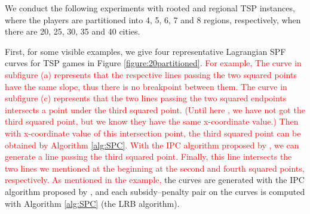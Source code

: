 \documentclass[authoryear,review,12pt]{elsarticle}
\begin{document}
We conduct the following experiments with rooted and regional TSP instances, where the players are partitioned into 4, 5, 6, 7 and 8 regions, respectively, when there are 20, 25, 30, 35 and 40 cities.

First, for some visible examples, we give four representative Lagrangian SPF curves for TSP games in Figure \ref{figure:20partitioned}.
\textcolor{red}{For example, The curve in subfigure (a) represents that the respective lines passing the two squared points have the same slope, thus there is no breakpoint between them. The curve in subfigure (c) represents that the two lines passing the two squared endpoints intersects a point under the third squared point. (Until here , we have not got the third squared point, but we know they have the same x-coordinate value.) Then with x-coordinate value of this intersection point, the third squared point can be obtained by Algorithm \ref{alg:SPC}. With the IPC algorithm proposed by \cite{leastcore2018}, we can generate a line passing the third squared point. Finally, this line intersects the two lines we mentioned at the beginning at the second and fourth squared points, respectively. As mentioned in the example,} the curves are generated with the IPC algorithm proposed by \cite{leastcore2018}, and each subsidy--penalty pair on the curves is computed with Algorithm \ref{alg:SPC} (the LRB algorithm).
\end{document}
